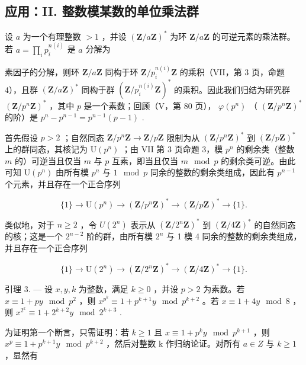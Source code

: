 \subsection{应用：II. 整数模某数的单位乘法群}

设 \(a\) 为一个有理整数 \(> 1\) ，并设 \((\mathbf{Z} / a\mathbf{Z})^*\) 为环 \(\mathbf{Z} / a\mathbf{Z}\) 的可逆元素的乘法群。若 \(a = \prod_{i} p_i^{n(i)}\) 是 \(a\) 分解为

素因子的分解，则环 \(\mathbf{Z}/a\mathbf{Z}\) 同构于环 \(\mathbf{Z}/p_{i}^{n(i)}\mathbf{Z}\) 的乘积（VII，第 3 页，命题 4），且群 \((\mathbf{Z}/a\mathbf{Z})^{*}\) 同构于群 \((\mathbf{Z}/p_{i}^{n(i)}\mathbf{Z})^{*}\) 的乘积。因此我们归结为研究群 \((\mathbf{Z}/p^{n}\mathbf{Z})^{*}\) ，其中 \(p\) 是一个素数；回顾（V，第 80 页）， \(\varphi(p^{n})\) （ \((\mathbf{Z}/p^{n}\mathbf{Z})^{*}\) 的阶）是 \(p^{n}-p^{n-1}=p^{n-1}(p-1)\) .

首先假设 \(p > 2\) ；自然同态 \(\mathbf{Z} / p^n\mathbf{Z} \to \mathbf{Z} / p\mathbf{Z}\) 限制为从 \((\mathbf{Z} / p^n\mathbf{Z})^*\) 到 \((\mathbf{Z} / p\mathbf{Z})^*\) 上的群同态，其核记为 \(\mathrm{U}(p^n)\) ；由 VII 第 3 页命题 3，模 \(p^n\) 的剩余类（整数 \(m\) 的）可逆当且仅当 \(m\) 与 \(p\) 互素，即当且仅当 \(m \mod p\) 的剩余类可逆。由此可知 \(\mathrm{U}(p^n)\) 由所有模 \(p^n\) 与 \(1 \mod p\) 同余的整数的剩余类组成，因此有 \(p^{n-1}\) 个元素，并且存在一个正合序列

\[
\{1 \} \rightarrow \mathrm{U} (p ^ {n}) \rightarrow (\mathbf {Z} / p ^ {n} \mathbf {Z}) ^ {*} \rightarrow (\mathbf {Z} / p \mathbf {Z}) ^ {*} \rightarrow \{1 \}.\tag{3}
\]

类似地，对于 \(n \geqslant 2\) ，令 \(U(2^n)\) 表示从 \((\mathbf{Z}/2^n\mathbf{Z})^*\) 到 \((\mathbf{Z}/4\mathbf{Z})^*\) 的自然同态的核；这是一个 \(2^{n-2}\) 阶的群，由所有模 \(2^n\) 与 1 模 4 同余的整数的剩余类组成，并且存在一个正合序列

\[
\{1 \} \rightarrow \mathrm{U} (2 ^ {n}) \rightarrow (\mathbf {Z} / 2 ^ {n} \mathbf {Z}) ^ {*} \rightarrow (\mathbf {Z} / 4 \mathbf {Z}) ^ {*} \rightarrow \{1 \}.\tag{4}
\]

引理 3. --- 设 \(x, y, k\) 为整数，满足 \(k \geqslant 0\) ，并设 \(p > 2\) 为素数。若 \(x \equiv 1 + py \mod p^2\) ，则 \(x^{p^k} \equiv 1 + p^{k+1}y \mod p^{k+2}\) 。若 \(x \equiv 1 + 4y \mod 8\) ，则 \(x^{2^k} \equiv 1 + 2^{k+2}y \mod 2^{k+3}\) .

为证明第一个断言，只需证明：若 \(k \geqslant 1\) 且 \(x \equiv 1 + p^{k}y \mod p^{k+1}\) ，则 \(x^{p} \equiv 1 + p^{k+1}y \mod p^{k+2}\) ，然后对整数 k 作归纳论证。对所有 \(a \in Z\) 与 \(k \geqslant 1\) ，显然有

